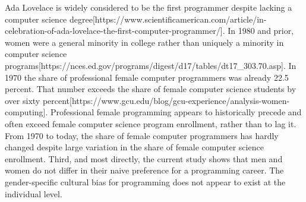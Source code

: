 \documentclass[review]{elsarticle}
\begin{document}
Ada Lovelace is widely considered to be the first programmer despite lacking a computer science degree[https://www.scientificamerican.com/article/in-celebration-of-ada-lovelace-the-first-computer-programmer/].
In 1980 and prior, women were a general minority in college rather than uniquely a minority in computer science programs[https://nces.ed.gov/programs/digest/d17/tables/dt17_303.70.asp].
In 1970 the share of professional female computer programmers was already 22.5 percent.
That number exceeds the share of female computer science students by over sixty percent[https://www.gcu.edu/blog/gcu-experience/analysis-women-computing].
Professional female programming appears to historically precede and often exceed female computer science program enrollment,
rather than to lag it.
From 1970 to today, the share of female computer programmers has hardly changed despite large variation in the share of female computer science enrollment.
Third, and most directly, the current study shows that men and women do not differ in their naive preference for a programming career.
The gender-specific cultural bias for programming does not appear to exist at the individual level.

\end{document}
